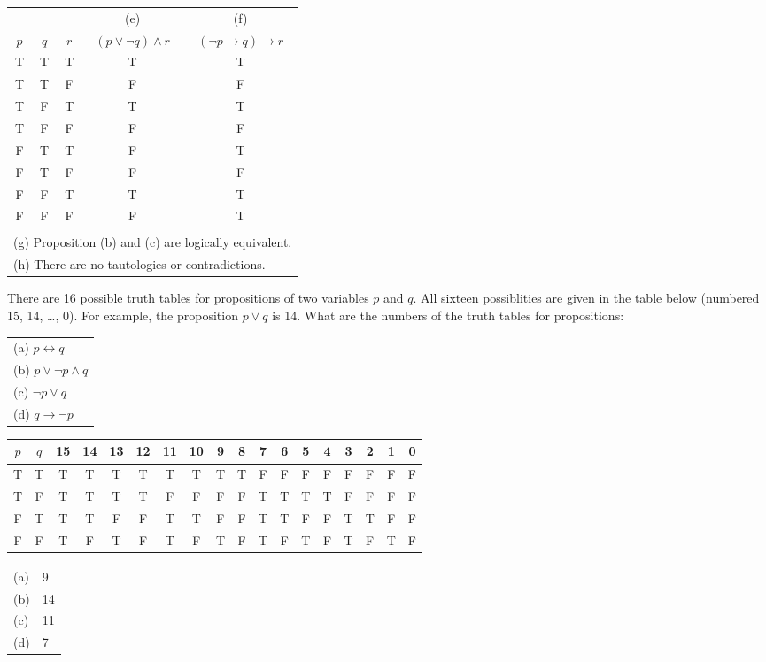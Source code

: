 \documentclass[12pt]{exam}
\begin{document}
\begin{questions}
\begin{solution}
    \begin{tabular}{|ccc|c|c|}
      & & & (e) & (f) \\
     $p$ & $q$ & $r$ & $(p \vee \neg q) \wedge r$ & $(\neg p \rightarrow q) \rightarrow r$ \\
     \hline
     T & T & T & T & T \\
     T & T & F & F & F \\
     T & F & T & T & T \\
     T & F & F & F & F \\
     F & T & T & F & T \\
     F & T & F & F & F \\
     F & F & T & T & T \\
     F & F & F & F & T \\
     \multicolumn{5}{|c|}{} \\
     \multicolumn{5}{|l|}{(g) Proposition (b) and (c) are logically equivalent.} \\
     \multicolumn{5}{|l|}{(h) There are no tautologies or contradictions.} \\
    \end{tabular}
   \end{solution}


\question[8] There are 16 possible truth tables for propositions of two variables $p$ and $q$.  All sixteen possiblities are given in the table below (numbered 15, 14, \ldots, 0).  For example, the proposition $p \vee q$ is 14. What are the numbers of the truth tables for propositions:\\
 \begin{tabular}{l}
    (a) $p \leftrightarrow q$ \\
    (b) $p \vee \neg p \wedge q$ \\
    (c) $\neg p \vee q $ \\
    (d) $q \rightarrow \neg p$ \\
 \end{tabular}

 \begin{tabular}{cc|cccc|cccc|cccc|cccc}
    $p$ & $q$ & 15 & 14 & 13 & 12 & 11 & 10 & 9 & 8 & 7 & 6 & 5 & 4 & 3 & 2 & 1 & 0 \\
    \hline
    T & T & T & T & T & T & T & T & T & T & F & F & F & F & F & F & F & F \\
    T & F & T & T & T & T & F & F & F & F & T & T & T & T & F & F & F & F \\
    F & T & T & T & F & F & T & T & F & F & T & T & F & F & T & T & F & F \\
    F & F & T & F & T & F & T & F & T & F & T & F & T & F & T & F & T & F \\
 \end{tabular}
 \begin{solution}
    \begin{tabular}{ll}
        (a) & 9 \\
        (b) & 14 \\
        (c) & 11 \\
        (d) & 7 \\
    \end{tabular}
 \end{solution}



\end{questions}
\end{document}
